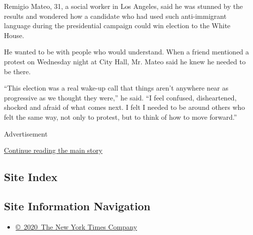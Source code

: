 Remigio Mateo, 31, a social worker in Los Angeles, said he was stunned
by the results and wondered how a candidate who had used such
anti-immigrant language during the presidential campaign could win
election to the White House.

He wanted to be with people who would understand. When a friend
mentioned a protest on Wednesday night at City Hall, Mr. Mateo said he
knew he needed to be there.

``This election was a real wake-up call that things aren't anywhere near
as progressive as we thought they were,'' he said. ``I feel confused,
disheartened, shocked and afraid of what comes next. I felt I needed to
be around others who felt the same way, not only to protest, but to
think of how to move forward.''

Advertisement

\protect\hyperlink{after-bottom}{Continue reading the main story}

\hypertarget{site-index}{%
\subsection{Site Index}\label{site-index}}

\hypertarget{site-information-navigation}{%
\subsection{Site Information
Navigation}\label{site-information-navigation}}

\begin{itemize}
\tightlist
\item
  \href{https://help.nytimes3xbfgragh.onion/hc/en-us/articles/115014792127-Copyright-notice}{©~2020~The
  New York Times Company}
\end{itemize}

